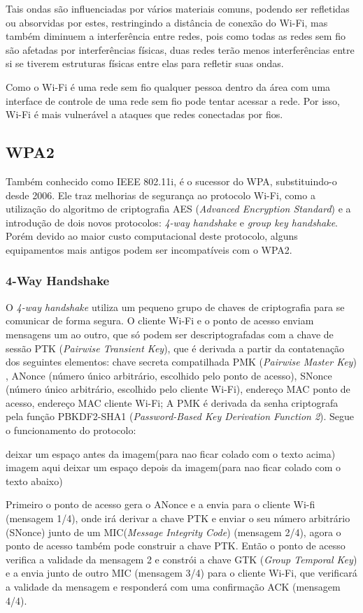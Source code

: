 \documentclass[12pt]{article}
\begin{document}
Tais ondas são influenciadas por vários materiais comuns, podendo ser refletidas ou absorvidas por estes, restringindo a distância de conexão do Wi-Fi, mas também diminuem a interferência entre redes, pois como todas as redes sem fio são afetadas por interferências físicas, duas redes terão menos interferências entre si se tiverem estruturas físicas entre elas para refletir suas ondas.

Como o Wi-Fi é uma rede sem fio qualquer pessoa dentro da área com uma interface de controle de uma rede sem fio pode tentar acessar a rede. Por isso, Wi-Fi é mais vulnerável a ataques que redes conectadas por fios.

\subsection{WPA2}
	Também conhecido como IEEE 802.11i, é o sucessor do WPA, substituindo-o desde 2006.
Ele traz melhorias de segurança ao protocolo Wi-Fi, como a utilização do algoritmo de criptografia AES (\textit{Advanced Encryption Standard}) e a introdução de dois novos protocolos: \textit{4-way handshake} e \textit{group key handshake}. Porém devido ao maior custo computacional deste protocolo, alguns equipamentos mais antigos podem ser incompatíveis com o WPA2.

\subsubsection{4-Way Handshake}
O \textit{4-way handshake} utiliza um pequeno grupo de chaves de criptografia para se comunicar de forma segura.
O cliente Wi-Fi e o ponto de acesso enviam mensagens um ao outro, que só podem ser descriptografadas com a chave de sessão PTK (\textit{Pairwise Transient Key}), que é derivada a partir da contatenação dos seguintes elementos: chave secreta compatilhada PMK (\textit{Pairwise Master Key}) , ANonce (número único arbitrário, escolhido pelo ponto de acesso), SNonce (número único arbitrário, escolhido pelo cliente Wi-Fi), endereço MAC ponto de acesso, endereço MAC cliente Wi-Fi; A PMK é derivada da senha criptografa pela função PBKDF2-SHA1 (\textit{Password-Based Key Derivation Function 2}).
	Segue o funcionamento do protocolo:

	{deixar um espaço antes da imagem(para nao ficar colado com o texto acima)}
	{imagem aqui}
	{deixar um espaço depois da imagem(para nao ficar colado com o texto abaixo)}

	Primeiro o ponto de acesso gera o ANonce e a envia para o cliente Wi-fi (mensagem 1/4), onde irá derivar a chave PTK e enviar o seu número arbitrário (SNonce) junto de um MIC(\textit{Message Integrity Code}) (mensagem 2/4), agora o ponto de acesso também pode construir a chave PTK. Então o ponto de acesso verifica a validade da mensagem 2 e constrói a chave GTK (\textit{Group Temporal Key}) e a envia junto de outro MIC (mensagem 3/4) para o cliente Wi-Fi, que verificará a validade da mensagem e responderá com uma confirmação ACK (mensagem 4/4).
\end{document}
